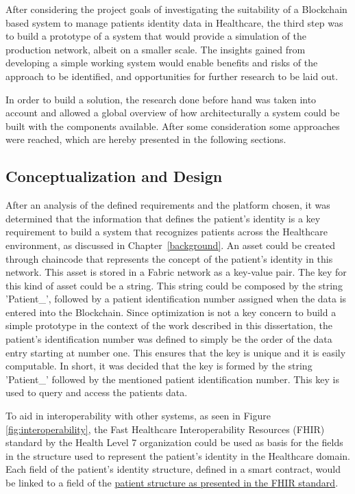 After considering the project goals of investigating the suitability of a
Blockchain based system to manage patients identity data in Healthcare, the third step was to
build a prototype of a system that would provide a simulation of the production
network, albeit on a smaller scale. The insights gained from developing a
simple working system would enable benefits and risks of the approach to be
identified, and opportunities for further research to be laid out.

In order to build a solution, the research done before hand was taken into
account and allowed a global overview of how architecturally a system could be
built with the components available. After some consideration some approaches
were reached, which are hereby presented in the following sections.

\subsection{Conceptualization and Design}

After an analysis of the defined requirements and the platform chosen, it was determined that the information that defines the
patient's identity is a key requirement to build a system that recognizes
patients across the Healthcare environment, as discussed in
Chapter~\ref{background}. An asset could be created through chaincode that
represents the concept of the patient's identity in this network. This asset is
stored in a Fabric network as a key-value pair. The key for this kind of asset
could be a string. This string could be composed by the string 'Patient\_', followed by a patient identification number assigned when the data is entered
into the Blockchain. Since optimization is not a key concern to build a simple
prototype in the context of the work described in this dissertation, the patient's identification number was
defined to simply be the order of the data entry starting at number one. This
ensures that the key is unique and it is easily computable. In short, it was
decided that the key is formed by the string 'Patient\_' followed by the
mentioned patient identification number. This key is used to query and access the patients data.

To aid in interoperability with other systems, as seen in Figure
\ref{fig:interoperability}, the Fast Healthcare Interoperability Resources
(FHIR) standard by the Health Level 7 organization could be used as basis for
the fields in the structure used to represent the patient's identity in the
Healthcare domain.  Each field of the patient's identity structure, defined in
a smart contract, would be linked to a field of the
\href{http://www.hl7.org/fhir/patient.html}{patient structure as presented in
the FHIR standard}.

